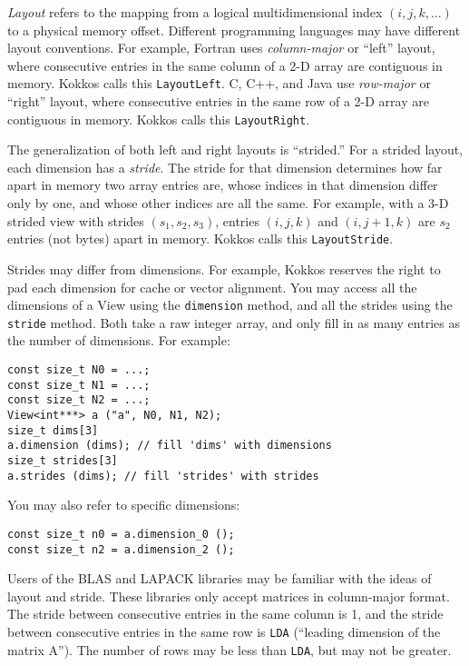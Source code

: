 \emph{Layout} refers to the mapping from a logical multidimensional
index $(i, j, k, \dots)$ to a physical memory offset.  Different
programming languages may have different layout conventions.  For
example, Fortran uses \emph{column-major} or ``left'' layout, where
consecutive entries in the same column of a 2-D array are contiguous
in memory.  Kokkos calls this \lstinline!LayoutLeft!.  C, C++, and Java use
\emph{row-major} or ``right'' layout, where consecutive entries in the
same row of a 2-D array are contiguous in memory.  Kokkos calls this
\lstinline!LayoutRight!.

The generalization of both left and right layouts is ``strided.''  For
a strided layout, each dimension has a \emph{stride}.  The stride for
that dimension determines how far apart in memory two array entries
are, whose indices in that dimension differ only by one, and whose
other indices are all the same.  For example, with a 3-D strided view
with strides $(s_1, s_2, s_3)$, entries $(i, j, k)$ and $(i, j+1, k)$
are $s_2$ entries (not bytes) apart in memory.  Kokkos calls this
\lstinline!LayoutStride!.

Strides may differ from dimensions.  For example, Kokkos reserves the
right to pad each dimension for cache or vector alignment.  You may
access all the dimensions of a View using the \lstinline!dimension! method,
and all the strides using the \lstinline!stride! method.  Both take a raw
integer array, and only fill in as many entries as the number of
dimensions.  For example:
\begin{lstlisting}
const size_t N0 = ...;
const size_t N1 = ...;
const size_t N2 = ...;
View<int***> a ("a", N0, N1, N2);
size_t dims[3]
a.dimension (dims); // fill 'dims' with dimensions
size_t strides[3]
a.strides (dims); // fill 'strides' with strides
\end{lstlisting}
You may also refer to specific dimensions:
\begin{lstlisting}
const size_t n0 = a.dimension_0 ();
const size_t n2 = a.dimension_2 ();
\end{lstlisting}

Users of the BLAS and LAPACK libraries may be familiar with the ideas
of layout and stride.  These libraries only accept matrices in
column-major format.  The stride between consecutive entries in the
same column is 1, and the stride between consecutive entries in the
same row is \lstinline!LDA! (``leading dimension of the matrix A'').  The
number of rows may be less than \lstinline!LDA!, but may not be greater.

